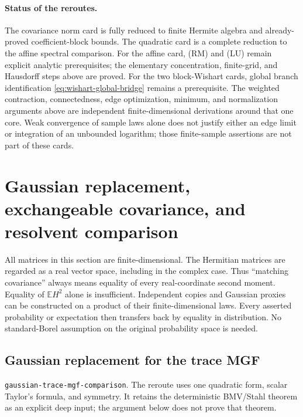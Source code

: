 \documentclass[11pt,a4paper]{article}
\DeclareRobustCommand{\code}[1]{{\footnotesize\urlstyle{tt}\nolinkurl{#1}}}
\begin{document}
\paragraph{Status of the reroutes.}
The covariance norm card is fully reduced to finite Hermite algebra and
already-proved coefficient-block bounds.  The quadratic card is a complete
reduction to the affine spectral comparison.  For the affine card, (RM)
and (LU) remain explicit analytic prerequisites; the elementary
concentration, finite-grid, and Hausdorff steps above are proved.
For the two block-Wishart cards, global branch identification
\eqref{eq:wishart-global-bridge} remains a prerequisite.  The weighted
contraction, connectedness, edge optimization, minimum, and normalization
arguments above are independent finite-dimensional derivations around
that one core.  Weak convergence of sample laws alone does not justify
either an edge limit or integration of an unbounded logarithm; those
finite-sample assertions are not part of these cards.


\section{Gaussian replacement, exchangeable covariance, and resolvent comparison}

All matrices in this section are finite-dimensional.  The Hermitian matrices
are regarded as a real vector space, including in the complex case.  Thus
``matching covariance'' always means equality of every real-coordinate
second moment.  Equality of $\mathbb E H^2$ alone is insufficient.
Independent copies and Gaussian proxies can be constructed on a product
of their finite-dimensional laws.  Every asserted probability or expectation
then transfers back by equality in distribution.  No standard-Borel
assumption on the original probability space is needed.

\subsection{Gaussian replacement for the trace MGF}
\label{route:gaussian-trace-mgf-comparison}
\code{gaussian-trace-mgf-comparison}.
The reroute uses one quadratic form, scalar Taylor's formula, and symmetry.
It retains the deterministic BMV/Stahl theorem as an explicit deep input;
the argument below does not prove that theorem.
\end{document}
